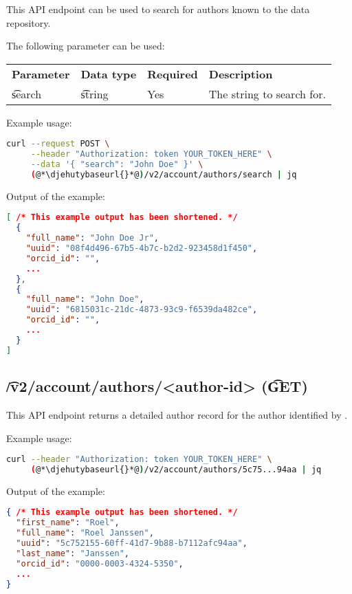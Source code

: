  This API endpoint can be used to search for authors known to the data
  repository.

  The following parameter can be used:

\begin{tabularx}{\textwidth}{*{3}{!{\VRule[-1pt]}l}!{\VRule[-1pt]}X}
  \headrow
  \textbf{Parameter} & \textbf{Data type} & \textbf{Required} & \textbf{Description}\\
  \t{search}         & \t{string}         & Yes               & The string to search for.
\end{tabularx}

  Example usage:
\begin{lstlisting}[language=bash]
curl --request POST \
     --header "Authorization: token YOUR_TOKEN_HERE" \
     --data '{ "search": "John Doe" }' \
     (@*\djehutybaseurl{}*@)/v2/account/authors/search | jq
\end{lstlisting}

  Output of the example:
\begin{lstlisting}[language=JSON]
[ /* This example output has been shortened. */
  {
    "full_name": "John Doe Jr",
    "uuid": "08f4d496-67b5-4b7c-b2d2-923458d1f450",
    "orcid_id": "",
    ...
  },
  {
    "full_name": "John Doe",
    "uuid": "6815031c-21dc-4873-93c9-f6539da482ce",
    "orcid_id": "",
    ...
  }
]
\end{lstlisting}

\subsection{\t{/v2/account/authors/<author-id>} (\t{GET})}

  This API endpoint returns a detailed author record for the author identified
  by \code{author-id}.

  Example usage:
\begin{lstlisting}[language=bash]
curl --header "Authorization: token YOUR_TOKEN_HERE" \
     (@*\djehutybaseurl{}*@)/v2/account/authors/5c75...94aa | jq
\end{lstlisting}

  Output of the example:
\begin{lstlisting}[language=JSON]
{ /* This example output has been shortened. */
  "first_name": "Roel",
  "full_name": "Roel Janssen",
  "uuid": "5c752155-60ff-41d7-9b88-b7112afc94aa",
  "last_name": "Janssen",
  "orcid_id": "0000-0003-4324-5350",
  ...
}
\end{lstlisting}

